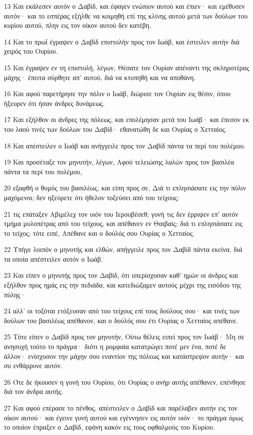 \par 13 Και εκάλεσεν αυτόν ο Δαβίδ, και έφαγεν ενώπιον αυτού και έπιεν· και εμέθυσεν αυτόν· και το εσπέρας εξήλθε να κοιμηθή επί της κλίνης αυτού μετά των δούλων του κυρίου αυτού, πλην εις τον οίκον αυτού δεν κατέβη.
\par 14 Και το πρωΐ έγραψεν ο Δαβίδ επιστολήν προς τον Ιωάβ, και έστειλεν αυτήν διά χειρός του Ουρίου.
\par 15 Και έγραψεν εν τη επιστολή, λέγων, Θέσατε τον Ουρίαν απέναντι της σκληροτέρας μάχης· έπειτα σύρθητε απ' αυτού, διά να κτυπηθή και να αποθάνη.
\par 16 Και αφού παρετήρησε την πόλιν ο Ιωάβ, διώρισε τον Ουρίαν εις θέσιν, όπου ήξευρεν ότι ήσαν άνδρες δυνάμεως.
\par 17 Και εξήλθον οι άνδρες της πόλεως, και επολέμησαν μετά του Ιωάβ· και έπεσον εκ του λαού τινές των δούλων του Δαβίδ· εθανατώθη δε και Ουρίας ο Χετταίος.
\par 18 Και απέστειλεν ο Ιωάβ και ανήγγειλε προς τον Δαβίδ πάντα τα περί του πολέμου.
\par 19 Και προσέταξε τον μηνυτήν, λέγων, Αφού τελειώσης λαλών προς τον βασιλέα πάντα τα περί του πολέμου,
\par 20 εξαφθή ο θυμός του βασιλέως, και είπη προς σε, Διά τι επλησιάσατε εις την πόλιν μαχόμενοι; δεν ηξεύρετε ότι ήθελον τοξεύσει από του τείχους;
\par 21 τις επάταξεν Αβιμέλεχ τον υιόν του Ιερουβέσεθ; γυνή τις δεν έρριψεν επ' αυτόν τμήμα μυλοπέτρας από του τείχους, και απέθανεν εν Θαιβαίς; διά τι επλησιάσατε εις το τείχος; τότε ειπέ, Απέθανε και ο δούλός σου Ουρίας ο Χετταίος.
\par 22 Υπήγε λοιπόν ο μηνυτής και ελθών, απήγγειλε προς τον Δαβίδ πάντα εκείνα, διά τα οποία απέστειλεν αυτόν ο Ιωάβ.
\par 23 Και είπεν ο μηνυτής προς τον Δαβίδ, ότι υπερίσχυσαν καθ' ημών οι άνδρες και εξήλθον προς ημάς εις την πεδιάδα, και κατεδιώξαμεν αυτούς μέχρι της εισόδου της πύλης·
\par 24 αλλ' οι τοξόται ετόξευσαν από του τείχους επί τους δούλους σου· και τινές των δούλων του βασιλέως απέθανον, και ο δούλός σου έτι Ουρίας ο Χετταίος απέθανε.
\par 25 Τότε είπεν ο Δαβίδ προς τον μηνυτήν, Ούτω θέλεις ειπεί προς τον Ιωάβ· Μη σε ανησυχή τούτο το πράγμα· διότι η ρομφαία κατατρώγει ποτέ μεν ένα, ποτέ δε άλλον· ενίσχυσον την μάχην σου εναντίον της πόλεως και κατάστρεψον αυτήν· και συ ενθάρρυνε αυτόν.
\par 26 Ότε δε ήκουσεν η γυνή του Ουρίου, ότι Ουρίας ο ανήρ αυτής απέθανεν, επένθησε διά τον άνδρα αυτής.
\par 27 Και αφού επέρασε το πένθος, απέστειλεν ο Δαβίδ και παρέλαβεν αυτήν εις τον οίκον αυτού· και έγεινε γυνή αυτού και εγέννησεν εις αυτόν υιόν· το πράγμα όμως το οποίον έπραξεν ο Δαβίδ, εφάνη κακόν εις τους οφθαλμούς του Κυρίου.

